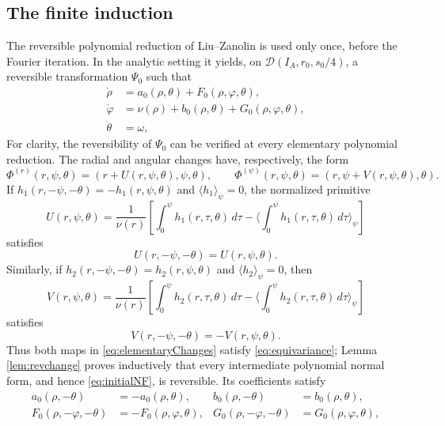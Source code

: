 \documentclass[11pt]{amsart}
\theoremstyle{remark}
\newcommand{\av}[1]{\langle #1\rangle}
\newcommand{\cD}{\mathcal D}
\begin{document}
\subsection{The finite induction}

The reversible polynomial reduction of Liu--Zanolin is used only once,
before the Fourier iteration.  In the analytic setting it yields, on
$\cD(I_A,r_0,s_0/4)$, a reversible transformation $\Psi_0$ such that
\begin{equation}\label{eq:initialNF}
 \begin{aligned}
 \dot\rho&=a_0(\rho,\theta)+F_0(\rho,\varphi,\theta),\\
 \dot\varphi&=\nu(\rho)+b_0(\rho,\theta)
                   +G_0(\rho,\varphi,\theta),\\
 \dot\theta&=\omega,
 \end{aligned}
\end{equation}
For clarity, the reversibility of $\Psi_0$ can be verified at every
elementary polynomial reduction.  The radial and angular changes have,
respectively, the form
\begin{equation}\label{eq:elementaryChanges}
 \Phi^{(r)}(r,\psi,\theta)
 =(r+U(r,\psi,\theta),\psi,\theta),\qquad
 \Phi^{(\psi)}(r,\psi,\theta)
 =(r,\psi+V(r,\psi,\theta),\theta).
\end{equation}
If $h_1(r,-\psi,-\theta)=-h_1(r,\psi,\theta)$ and
$\av{h_1}_{\psi}=0$, the normalized primitive
\begin{equation}\label{eq:Uprimitive}
 U(r,\psi,\theta)
 =\frac1{\nu(r)}
 \left[
 \int_0^\psi h_1(r,\tau,\theta)\,d\tau
 -\av{\int_0^\psi h_1(r,\tau,\theta)\,d\tau}_{\psi}
 \right]
\end{equation}
satisfies
\[
 U(r,-\psi,-\theta)=U(r,\psi,\theta).
\]
Similarly, if
$h_2(r,-\psi,-\theta)=h_2(r,\psi,\theta)$ and
$\av{h_2}_{\psi}=0$, then
\begin{equation}\label{eq:Vprimitive}
 V(r,\psi,\theta)
 =\frac1{\nu(r)}
 \left[
 \int_0^\psi h_2(r,\tau,\theta)\,d\tau
 -\av{\int_0^\psi h_2(r,\tau,\theta)\,d\tau}_{\psi}
 \right]
\end{equation}
satisfies
\[
 V(r,-\psi,-\theta)=-V(r,\psi,\theta).
\]
Thus both maps in \eqref{eq:elementaryChanges} satisfy
\eqref{eq:equivariance}; Lemma \ref{lem:revchange} proves inductively that
every intermediate polynomial normal form, and hence \eqref{eq:initialNF},
is reversible.  Its coefficients satisfy
\begin{equation}\label{eq:initialparity}
 \begin{aligned}
 a_0(\rho,-\theta)&=-a_0(\rho,\theta),&
 b_0(\rho,-\theta)&= b_0(\rho,\theta),\\
 F_0(\rho,-\varphi,-\theta)&=-F_0(\rho,\varphi,\theta),&
 G_0(\rho,-\varphi,-\theta)&= G_0(\rho,\varphi,\theta),
 \end{aligned}
\end{equation}
\end{document}
